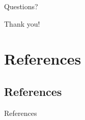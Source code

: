 \documentclass[onlymath,xcolor=pdftex,dvipsnames,table]{beamer}
\newcommand{\felix}{\textsc{Felix}\xspace}
\let\oldemph\emph
\renewcommand{\emph}[1]{{\color{Blue}\oldemph{#1}}}
\begin{document}


\begin{frame}{Questions?}
\begin{center}
  \LARGE Thank you!
\end{center}
\end{frame}


\section{References}
\subsection{References}
\begin{frame}[allowframebreaks]{References}
  
  
\end{frame}
\end{document}

